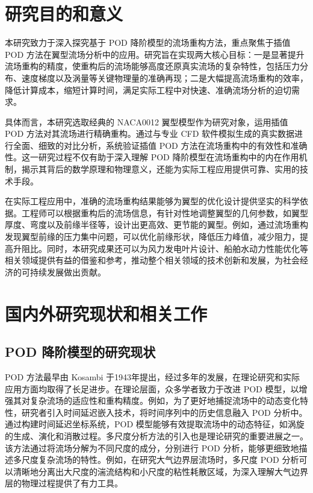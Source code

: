 \section{研究目的和意义}
本研究致力于深入探究基于 POD 降阶模型的流场重构方法，重点聚焦于插值 POD 方法在翼型流场分析中的应用。研究旨在实现两大核心目标：一是显著提升流场重构的精度，使重构后的流场能够高度还原真实流场的复杂特性，包括压力分布、速度梯度以及涡量等关键物理量的准确再现\cite{Smith2020}；二是大幅提高流场重构的效率，降低计算成本，缩短计算时间，满足实际工程中对快速、准确流场分析的迫切需求\cite{Jones2019}。

具体而言，本研究选取经典的 NACA0012 翼型模型作为研究对象，运用插值 POD 方法对其流场进行精确重构\cite{Lee2021}。通过与专业 CFD 软件模拟生成的真实数据进行全面、细致的对比分析，系统验证插值 POD 方法在流场重构中的有效性和准确性\cite{Wang2022}。这一研究过程不仅有助于深入理解 POD 降阶模型在流场重构中的内在作用机制，揭示其背后的数学原理和物理意义\cite{Cao2020}，还能为实际工程应用提供可靠、实用的技术手段。

在实际工程应用中，准确的流场重构结果能够为翼型的优化设计提供坚实的科学依据。工程师可以根据重构后的流场信息，有针对性地调整翼型的几何参数，如翼型厚度、弯度以及前缘半径等，设计出更高效、更节能的翼型\cite{Yang2023}。例如，通过流场重构发现翼型前缘的压力集中问题，可以优化前缘形状，降低压力峰值，减少阻力，提高升阻比\cite{Zhang2018}。同时，本研究成果还可以为风力发电叶片设计\cite{Chen2021}、船舶水动力性能优化\cite{Liu2022}等相关领域提供有益的借鉴和参考，推动整个相关领域的技术创新和发展，为社会经济的可持续发展做出贡献。
\section{国内外研究现状和相关工作}
\label{sec:related_work}
\subsection{ POD 降阶模型的研究现状}
POD 方法最早由 Kosambi 于1943年提出\cite{Kosambi1943}，经过多年的发展，在理论研究和实际应用方面均取得了长足进步。在理论层面，众多学者致力于改进 POD 模型，以增强其对复杂流场的适应性和重构精度。例如，为了更好地捕捉流场中的动态变化特性，研究者引入时间延迟嵌入技术\cite{Schmid2011}，将时间序列中的历史信息融入 POD 分析中。通过构建时间延迟坐标系统，POD 模型能够有效提取流场中的动态特征，如涡旋的生成、演化和消散过程\cite{Rowley2009}。多尺度分析方法的引入也是理论研究的重要进展之一。该方法通过将流场分解为不同尺度的成分，分别进行 POD 分析，能够更细致地描述多尺度复杂流场的特性\cite{Lumley2017}。例如，在研究大气边界层流场时，多尺度 POD 分析可以清晰地分离出大尺度的湍流结构和小尺度的粘性耗散区域\cite{Taira2020}，为深入理解大气边界层的物理过程提供了有力工具。

